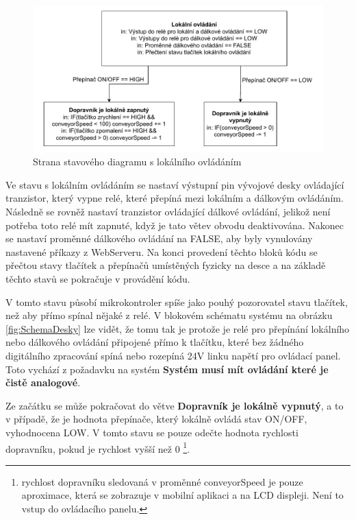 \begin{figure}[H]
	\centering
	\includegraphics[width=1\linewidth]{images/StateFlow_Firmwaru_left.drawio.pdf}
	\caption{Strana stavového diagramu s lokálního ovládáním}
	\label{fig:StateFlow_Firmwaru_left}
\end{figure}

Ve stavu s lokálním ovládáním se nastaví výstupní pin vývojové desky ovládající tranzistor, který vypne relé, které přepíná mezi lokálním a dálkovým ovládáním. Následně se rovněž nastaví tranzistor ovládající dálkové ovládání, jelikož není potřeba toto relé mít zapnuté, když je tato větev obvodu deaktivována. Nakonec se nastaví proměnné dálkového ovládání na FALSE, aby byly vynulovány nastavené příkazy z WebServeru. Na konci provedení těchto bloků kódu se přečtou stavy tlačítek a přepínačů umístěných fyzicky na desce a na základě těchto stavů se pokračuje v provádění kódu.

V tomto stavu působí mikrokontroler spíše jako pouhý pozorovatel stavu tlačítek, než aby přímo spínal nějaké z relé. V blokovém schématu systému na obrázku \ref{fig:SchemaDesky} lze vidět, že tomu tak je protože je relé pro přepínání lokálního nebo dálkového ovládání připojené přímo k tlačítku, které bez žádného digitálního zpracování spíná nebo rozepíná 24V linku napětí pro ovládací panel. Toto vychází z požadavku na systém \textbf{Systém musí mít ovládání které je čistě analogové}.

Ze začátku se může pokračovat do větve \textbf{Dopravník je lokálně vypnutý}, a to v případě, že je hodnota přepínače, který lokálně ovládá stav ON/OFF, vyhodnocena LOW. V tomto stavu se pouze odečte hodnota rychlosti dopravníku, pokud je rychlost vyšší než 0 \footnote{rychlost dopravníku sledovaná v proměnné conveyorSpeed je pouze aproximace, která se zobrazuje v mobilní aplikaci a na LCD displeji. Není to vstup do ovládacího panelu.}.


